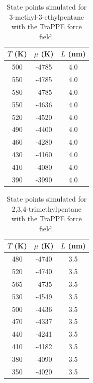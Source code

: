 \documentclass[journal=jctc,manuscript=article]{achemso}
\begin{document}
\begin{table}[htb!]
	\caption{State points simulated for 3-methyl-3-ethylpentane with the TraPPE force field.}
	\begin{center}
		\begin{tabular}{|c|c|c|}
			\hline
			$T$ (K) & $\mu$ (K) & $L$ (nm) \\ \hline
			500	&	-4785	&	4.0	\\
			550	&	-4785	&	4.0	\\
			580	&	-4785	&	4.0	\\
			550	&	-4636	&	4.0	\\
			520	&	-4520	&	4.0	\\
			490	&	-4400	&	4.0	\\
			460	&	-4280	&	4.0	\\
			430	&	-4160	&	4.0	\\
			410	&	-4080	&	4.0	\\
			390	&	-3990	&	4.0	\\
			\hline
		\end{tabular}
	\end{center}
\end{table}

\begin{table}[htb!]
	\caption{State points simulated for 2,3,4-trimethylpentane with the TraPPE force field.}
	\begin{center}
		\begin{tabular}{|c|c|c|}
			\hline
			$T$ (K) & $\mu$ (K) & $L$ (nm) \\ \hline
			480	&	-4740	&	3.5	\\
			520	&	-4740	&	3.5	\\
			565	&	-4735	&	3.5	\\
			530	&	-4549	&	3.5	\\
			500	&	-4436	&	3.5	\\
			470	&	-4337	&	3.5	\\
			440	&	-4241	&	3.5	\\
			410	&	-4182	&	3.5	\\
			380	&	-4090	&	3.5	\\
			350	&	-4020	&	3.5	\\
			\hline
		\end{tabular}
	\end{center}
\end{table}
\end{document}
